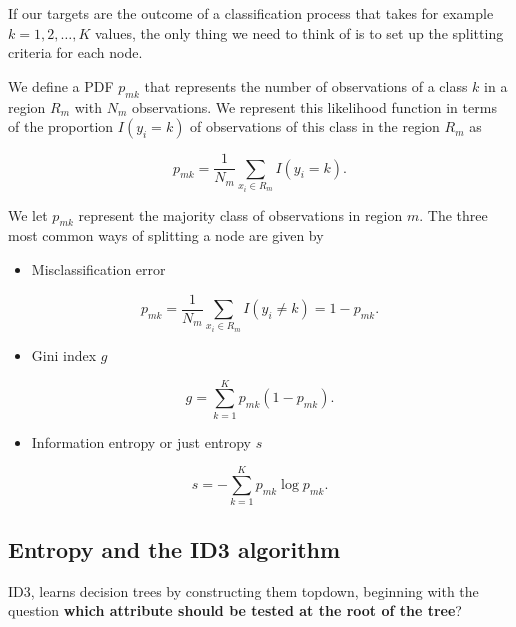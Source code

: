 \documentclass[%
oneside,                 %
final,                   %
10pt]{article}
\begin{document}
If our targets are the outcome of a classification process that takes
for example $k=1,2,\dots,K$ values, the only thing we need to think of
is to set up the splitting criteria for each node.

We define a PDF $p_{mk}$ that represents the number of observations of
a class $k$ in a region $R_m$ with $N_m$ observations. We represent
this likelihood function in terms of the proportion $I(y_i=k)$ of
observations of this class in the region $R_m$ as

\[
p_{mk} = \frac{1}{N_m}\sum_{x_i\in R_m}I(y_i=k).
\]

We let $p_{mk}$ represent the majority class of observations in region
$m$. The three most common ways of splitting a node are given by

\begin{itemize}
\item Misclassification error 
\end{itemize}

\noindent
\[
p_{mk} = \frac{1}{N_m}\sum_{x_i\in R_m}I(y_i\ne k) = 1-p_{mk}.
\]
\begin{itemize}
\item Gini index $g$
\end{itemize}

\noindent
\[
g = \sum_{k=1}^K p_{mk}(1-p_{mk}).
\]
\begin{itemize}
\item Information entropy or just entropy $s$
\end{itemize}

\noindent
\[
s = -\sum_{k=1}^K p_{mk}\log{p_{mk}}.
\]


\subsection{Entropy and the ID3 algorithm}

ID3, learns decision trees by constructing
them topdown, beginning with the question \textbf{which attribute should be tested at the root of the tree}?
\end{document}
